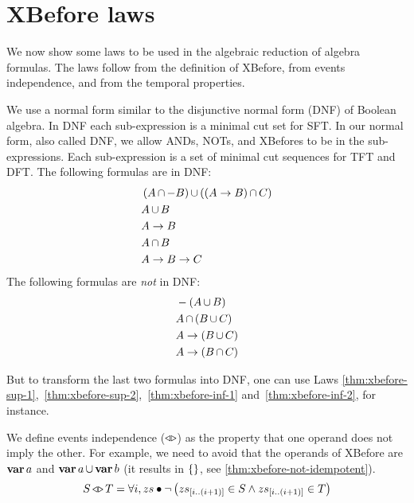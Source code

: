 \documentclass[12pt,openright,twoside,a4paper,oldfontcommands,english,brazil,draft]{abntex2}
\theoremstyle{theo}
\newcommand{\slice}[3]{\ensuremath #1_{\left[#2..#3\right]}}
\def\varop{\ensuremath\operatorname{\mathbf{var}}}
\newcommand{\var}[1]{\ensuremath\varop #1}
\def\xbeforeop{\ensuremath\rightarrow}
\newcommand{\xbefore}[2]{\ensuremath #1 \xbeforeop #2 }
\def\independenteventsop{\ensuremath\operatorname{\triangleleft\triangleright}}
\newcommand{\independentevents}[2]{\ensuremath #1 \independenteventsop #2}
\def\False{\ensuremath\operatorname{\left\{\right\}}}
\newcommand{\parsin}[1]{\ensuremath\left( #1 \right)}
\def\union{\ensuremath\operatorname{\cup}}
\def\inter{\ensuremath\operatorname{\cap}}
\begin{document}
\section{XBefore laws}
\label{sec:xbefore-laws}

We now show some laws to be used in the algebraic reduction of \ac{algebra} formulas.
The laws follow from the definition of XBefore, from events independence, and from the temporal properties.

We use a normal form similar to the disjunctive normal form (DNF) of Boolean algebra.
In DNF each sub-expression is a minimal cut set for \ac{SFT}.
In our normal form, also called DNF, we allow \acp{AND}, \acp{NOT}, and \acp{XBefore} to be in the sub-expressions.
Each sub-expression is a set of minimal cut sequences for \ac{TFT} and \ac{DFT}.
The following formulas are in DNF:
%
\begin{align*}
&\parsin{A \inter -B} \union \parsin{\parsin{\xbefore{A}{B}} \inter C}\\
&A \union B\\
&\xbefore{A}{B}\\
&A \inter B\\
&\xbefore{\xbefore{A}{B}}{C}
\end{align*}
%
The following formulas are \emph{not} in DNF:
%
\begin{align*}
&-\parsin{A \union B}\\
&A \inter \parsin{B \union C}\\
&\xbefore{A}{\parsin{B \union C}}\\
&\xbefore{A}{\parsin{B \inter C}}
\end{align*}

\begin{sloppypar}
But to transform the last two formulas into DNF, one can use Laws \eqref{thm:xbefore-sup-1},~\eqref{thm:xbefore-sup-2},~\eqref{thm:xbefore-inf-1} and~\eqref{thm:xbefore-inf-2}, for instance.
\end{sloppypar}

We define events independence ($\independenteventsop$) as the property that one operand does not imply the other.
For example, we need to avoid that the operands of XBefore are $\var{a}$ and $\var{a} \union \var{b}$ (it results in $\False$, see \eqref{thm:xbefore-not-idempotent}).
%
\begin{equation}
\independentevents{S}{T} = \forall i, zs \bullet
  \lnot \left(
    \slice{zs}{i}{\left(i+1\right)} \in S \land
    \slice{zs}{i}{\left(i+1\right)} \in T
  \right)
\end{equation}
\end{document}
